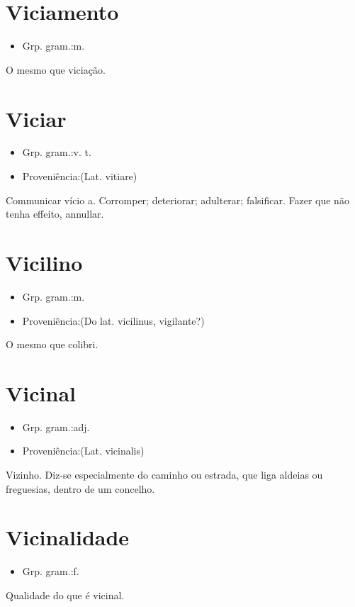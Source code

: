 \documentclass{article}
\begin{document}
\section{Viciamento}
\begin{itemize}
\item {Grp. gram.:m.}
\end{itemize}
O mesmo que \textunderscore viciação\textunderscore .
\section{Viciar}
\begin{itemize}
\item {Grp. gram.:v. t.}
\end{itemize}
\begin{itemize}
\item {Proveniência:(Lat. \textunderscore vitiare\textunderscore )}
\end{itemize}
Communicar vício a.
Corromper; deteriorar; adulterar; falsificar.
Fazer que não tenha effeito, annullar.
\section{Vicilino}
\begin{itemize}
\item {Grp. gram.:m.}
\end{itemize}
\begin{itemize}
\item {Proveniência:(Do lat. \textunderscore vicilinus\textunderscore , vigilante?)}
\end{itemize}
O mesmo que \textunderscore colibri\textunderscore .
\section{Vicinal}
\begin{itemize}
\item {Grp. gram.:adj.}
\end{itemize}
\begin{itemize}
\item {Proveniência:(Lat. \textunderscore vicinalis\textunderscore )}
\end{itemize}
Vizinho.
Diz-se especialmente do caminho ou estrada, que liga aldeias ou freguesias, dentro de um concelho.
\section{Vicinalidade}
\begin{itemize}
\item {Grp. gram.:f.}
\end{itemize}
Qualidade do que é vicinal.
\end{document}
